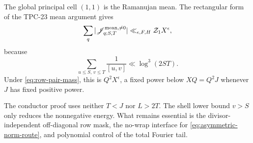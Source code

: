 The global principal cell \((1,1)\) is the Ramanujan mean.  The
rectangular form of the TPC-23 mean argument \citep{WangTPC23} gives
\begin{equation}
 \sum_q|\mathscr J_{q;S,T}^{\mathrm{mean},\ne0}|
 \ll_{\epsilon,F,H}\mathcal Z_1X^\epsilon,
 \label{eq:asymmetric-principal-mean}
\end{equation}
because
\[
 \sum_{u\le S,\,v\le T}\frac1{[u,v]}
 \ll\log^3(2ST).
\]
Under \eqref{eq:row-pair-mass}, this is \(Q^2X^\epsilon\), a fixed
power below \(XQ=Q^2J\) whenever \(J\) has fixed positive power.

\begin{remark}
\label{rem:asymmetric-no-long-short}
The conductor proof uses neither \(T<J\) nor \(L>2T\).  The shell
lower bound \(v>S\) only reduces the nonnegative energy.  What remains
essential is the divisor-independent off-diagonal row mask, the
no-wrap interface for \eqref{eq:asymmetric-norm-route}, and polynomial
control of the total Fourier tail.
\end{remark}
